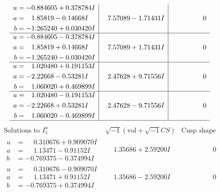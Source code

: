 \documentclass[1p]{elsarticle_modified}
\theoremstyle{definition}
\newcommand{\I}{\sqrt{-1}}
\begin{document}
$$\begin{array}{c|c|c}
\begin{aligned}
u &= -0.884605 + 0.378784 I \\
a &= \phantom{-}1.85819 - 0.14668 I \\
b &= -1.265240 + 0.030420 I\end{aligned}
 & \phantom{-}7.57089 - 1.71431 I & \phantom{-0.000000 } 0 \\ \hline\begin{aligned}
u &= -0.884605 - 0.378784 I \\
a &= \phantom{-}1.85819 + 0.14668 I \\
b &= -1.265240 - 0.030420 I\end{aligned}
 & \phantom{-}7.57089 + 1.71431 I & \phantom{-0.000000 } 0 \\ \hline\begin{aligned}
u &= \phantom{-}1.020480 + 0.191153 I \\
a &= -2.22668 - 0.53281 I \\
b &= \phantom{-}1.060020 + 0.469899 I\end{aligned}
 & \phantom{-}2.47628 + 9.71556 I & \phantom{-0.000000 } 0 \\ \hline\begin{aligned}
u &= \phantom{-}1.020480 - 0.191153 I \\
a &= -2.22668 + 0.53281 I \\
b &= \phantom{-}1.060020 - 0.469899 I\end{aligned}
 & \phantom{-}2.47628 - 9.71556 I & \phantom{-0.000000 } 0\\
 \hline 
 \end{array}$$\newpage$$\begin{array}{c|c|c}  
\text{Solutions to }I^u_{1}& \I (\text{vol} + \sqrt{-1}CS) & \text{Cusp shape}\\
 \hline 
\begin{aligned}
u &= \phantom{-}0.310676 + 0.909070 I \\
a &= \phantom{-}1.13471 - 0.91152 I \\
b &= -0.769375 - 0.374994 I\end{aligned}
 & \phantom{-}1.35686 + 2.59200 I & \phantom{-0.000000 } 0 \\ \hline\begin{aligned}
u &= \phantom{-}0.310676 - 0.909070 I \\
a &= \phantom{-}1.13471 + 0.91152 I \\
b &= -0.769375 + 0.374994 I\end{aligned}
 & \phantom{-}1.35686 - 2.59200 I & \phantom{-0.000000 } 0 \\ \hline\begin{aligned}

\end{aligned}
\end{array}$$
\end{document}
